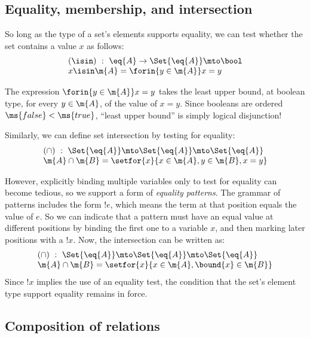 
\subsection{Equality, membership, and intersection}

So long as the type of a set's elements supports equality, we can test whether
the set contains a value $x$ as follows:
\[\begin{array}{l}
(\isin) ~:~ \eq{A} \uto \Set{\eq{A}} \mto \bool\\
x \isin \m{A} = \forin{y \in \m{A}} x = y
\end{array}\]

The expression $\forin{y \in \m{A}} x = y$ takes the least upper bound, at
boolean type, for every $y \in \m{A}$, of the value of $x = y$. Since booleans
are ordered $\ms{false} < \ms{true}$, ``least upper bound'' is simply logical
disjunction! %

Similarly, we can define set intersection by testing for equality:
\[\begin{array}{l}
(\cap) ~:~ \Set{\eq{A}} \mto \Set{\eq{A}} \mto \Set{\eq{A}}\\
\m{A} \cap \m{B} = \setfor{x}{x \in \m{A}, y \in \m{B}, x = y}
\end{array}\]

However, explicitly binding multiple variables only to test for
equality can become tedious, so we support a form
of \emph{equality patterns}. The grammar of patterns includes the form
$!e$, which means the term at that position equals
the value of $e$. So we can indicate that a pattern must have an
equal value at different positions by binding the first one to a
variable $x$, and then marking later positions with a $!x$. Now, the intersection can be written as:
\[\begin{array}{l}
(\cap) ~:~ \Set{\eq{A}} \mto \Set{\eq{A}} \mto \Set{\eq{A}}\\
\m{A} \cap \m{B} = \setfor{x}{x \in \m{A}, \bound{x} \in \m{B}}
\end{array}\]
Since $!x$ implies the use of an equality test, the condition that the
set's element type support equality remains in force.



\subsection{Composition of relations}

